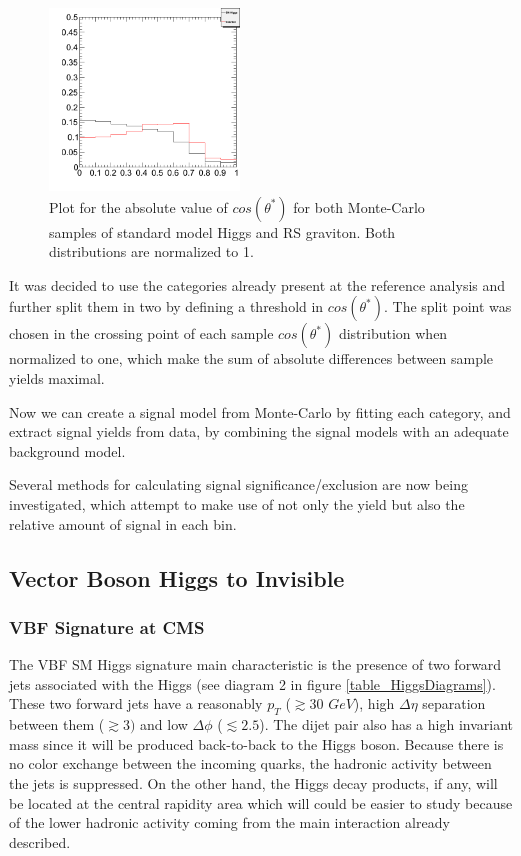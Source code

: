 \documentclass[%
reprint,
amsmath,
amssymb,
aps,
pra,
showkeys
]{revtex4-1}
\begin{document}
\begin{figure}[ht]
\centering
\includegraphics[width=0.45\textwidth]{img/cosThetaStar_cs_all_Norm1_SignalCompare.png}
\caption{Plot for the absolute value of $cos(\theta^{*})$ for both Monte-Carlo samples of standard model Higgs and RS graviton. 
Both distributions are normalized to 1.}
\label{figure_SpinAnalysis_CosThetaStar}
\end{figure}

It was decided to use the categories already present at the reference analysis and further split them in two by 
defining a threshold in $cos(\theta^{*})$. The split point was chosen in the crossing point of each sample 
$cos(\theta^{*})$ distribution when normalized to one, which make the sum of absolute differences between sample 
yields maximal.

Now we can create a signal model from Monte-Carlo by fitting each category, and extract signal yields from data, 
by combining the signal models with an adequate background model.

Several methods for calculating signal significance/exclusion are now being investigated, which attempt to make use 
of not only the yield but also the relative amount of signal in each bin.

\subsection{Vector Boson Higgs to Invisible}

\subsubsection{VBF Signature at CMS}

The VBF SM Higgs signature main characteristic is the presence of two forward jets associated with the Higgs 
(see diagram 2 in figure \ref{table_HiggsDiagrams}). These two forward jets have a reasonably $p_T$ ($\gtrsim30$ $GeV$), 
high $\Delta\eta$ separation between them ($\gtrsim 3)$ and low $\Delta\phi$ ($\lesssim 2.5$).
The dijet pair also has a high invariant mass since it will be produced back-to-back to the Higgs boson. Because there
is no color exchange between the incoming quarks, the hadronic activity between the jets is suppressed. On the other
hand, the Higgs decay products, if any, will be located at the central rapidity area which will could be easier to 
study because of the lower hadronic activity coming from the main interaction already 
described\cite{article:Dokshitzer:1991he}. 
\end{document}
